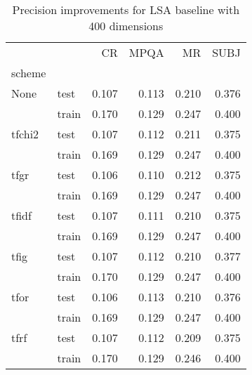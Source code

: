 \begin{table}[h]
\begin{center}

\begin{tabular}{llrrrr}
\toprule
{} &      &  CR &  MPQA &  MR &  SUBJ \\
scheme &  &            &              &            &              \\
\midrule
None & test &      0.107 &        0.113 &      0.210 &        0.376 \\
{} & train &      0.170 &        0.129 &      0.247 &        0.400 \\
tfchi2 & test &      0.107 &        0.112 &      0.211 &        0.375 \\
{} & train &      0.169 &        0.129 &      0.247 &        0.400 \\
tfgr & test &      0.106 &        0.110 &      0.212 &        0.375 \\
{} & train &      0.169 &        0.129 &      0.247 &        0.400 \\
tfidf & test &      0.107 &        0.111 &      0.210 &        0.375 \\
{} & train &      0.169 &        0.129 &      0.247 &        0.400 \\
tfig & test &      0.107 &        0.112 &      0.210 &        0.377 \\
{} & train &      0.170 &        0.129 &      0.247 &        0.400 \\
tfor & test &      0.106 &        0.113 &      0.210 &        0.376 \\
{} & train &      0.169 &        0.129 &      0.247 &        0.400 \\
tfrf & test &      0.107 &        0.112 &      0.209 &        0.375 \\
{} & train &      0.170 &        0.129 &      0.246 &        0.400 \\
\bottomrule
\end{tabular}

\caption[Precision improvements for LSA baseline with 400 dimensions]{Precision improvements for LSA baseline with 400 dimensions}
\label{tab:lsa:resuts:400}
\end{center}
\end{table}


